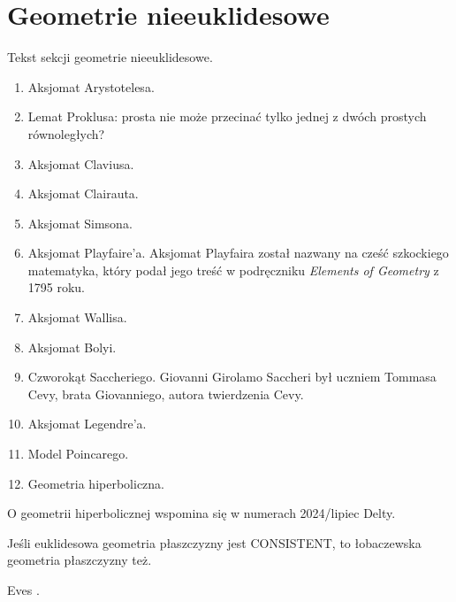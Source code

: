 %

\chapter{Geometrie nieeuklidesowe}
Tekst sekcji geometrie nieeuklidesowe.
\begin{enumerate}
	\item Aksjomat Arystotelesa. 
	\item Lemat Proklusa: prosta nie może przecinać tylko jednej z dwóch prostych równoległych? 
	\item Aksjomat Claviusa. 
	\item Aksjomat Clairauta. 
	\item Aksjomat Simsona. 
	\item Aksjomat Playfaire'a. 
	Aksjomat Playfaira został nazwany na cześć szkockiego matematyka, który podał jego treść w podręczniku \emph{Elements of Geometry} z 1795 roku.
%
	\item Aksjomat Wallisa. 
	\item Aksjomat Bolyi. 
	\item Czworokąt Saccheriego. %
	Giovanni Girolamo Saccheri był uczniem Tommasa Cevy, brata Giovanniego, autora twierdzenia Cevy.
	\item Aksjomat Legendre'a. 
	\item Model Poincarego. 
	\item Geometria hiperboliczna. 
\end{enumerate}

O geometrii hiperbolicznej wspomina się w numerach 2024/lipiec Delty.

\begin{proposition}
	Jeśli euklidesowa geometria płaszczyzny jest CONSISTENT, to łobaczewska geometria płaszczyzny też.
\end{proposition}

Eves \cite[s. 347-353]{eves1_1972}.

%